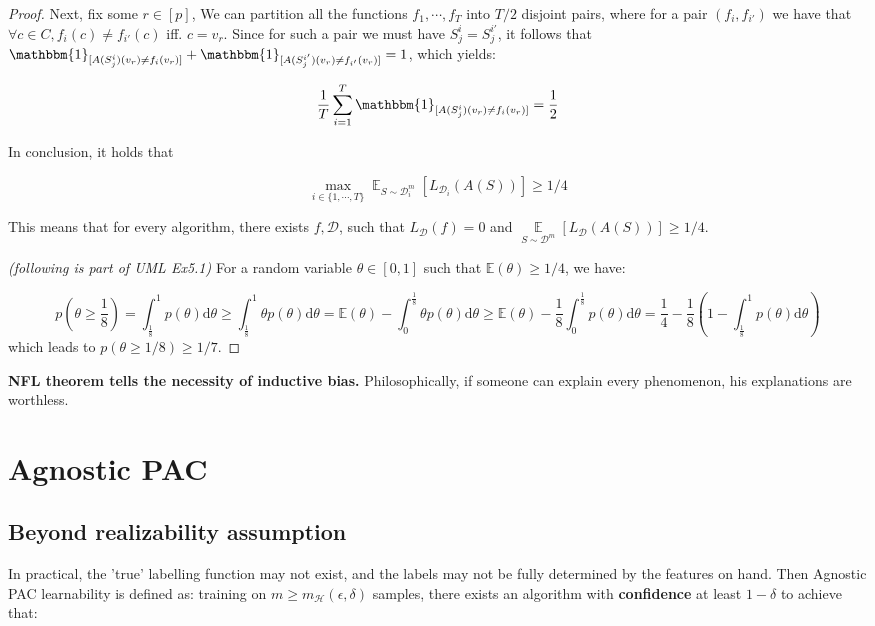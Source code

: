 \documentclass{article}
\newtheorem*{proof}{Proof}
\begin{document}
\begin{proof}
	Next, fix some $r\in[p]$, We can partition all the functions $f_1,\cdots,f_T$ into $T/2$ disjoint pairs, where for a pair $(f_i,f_{i'})$ we have that $\forall c\in C,f_i(c)\neq f_{i'}(c)$ iff. $c=v_r$. Since for such a pair we must have $S_j^i=S_j^{i'}$, it follows that $\mathbbm{1}_{[A(S_j^i)(v_r)\neq f_i(v_r)]}+\mathbbm{1}_{[A(S_j^{i'})(v_r)\neq f_{i'}(v_r)]}=1$, which yields:
	
	\begin{equation*}
	\frac{1}{T}\sum_{i=1}^T\mathbbm{1}_{[A(S_j^i)(v_r)\neq f_i(v_r)]}=\frac{1}{2}
	\end{equation*}

	In conclusion, it holds that

	\begin{equation*}
	\max_{i\in\{1,\cdots,T\}}\mathop{\mathbb{E}}_{S\sim\mathcal{D}_i^m}[L_{\mathcal{D}_i}(A(S))]\geq 1/4
	\end{equation*}

	This means that for every algorithm, there exists $f,\mathcal{D}$, such that $L_\mathcal{D}(f)=0$ and $\mathop{\mathbb{E}}\limits_{S\sim\mathcal{D}^m}[L_\mathcal{D}(A(S))]\geq 1/4$.

	\textit{(following is part of UML Ex5.1)} For a random variable $\theta\in[0,1]$ such that $\mathbb{E}(\theta)\geq 1/4$, we have:
	
	\begin{equation*}
	p\left(\theta\geq\frac{1}{8}\right)=\int_\frac{1}{8}^1 p(\theta) \mathrm{d}\theta \geq\int_\frac{1}{8}^1 \theta p(\theta) \mathrm{d}\theta=\mathbb{E}(\theta)-\int_0^\frac{1}{8}\theta p(\theta)\mathrm{d}\theta \geq\mathbb{E}(\theta)-\frac{1}{8}\int_0^\frac{1}{8} p(\theta)\mathrm{d}\theta = \frac{1}{4} - \frac{1}{8}\left( 1-\int^1_\frac{1}{8}p(\theta) \mathrm{d}\theta \right)
	\end{equation*}
which leads to $p(\theta\geq 1/8)\geq 1/7$.
	\end{proof}

	\textbf{NFL theorem tells the necessity of inductive bias.} Philosophically, if someone can explain every phenomenon, his explanations are worthless.
	
\section{Agnostic PAC}
	\subsection{Beyond realizability assumption}
	In practical, the 'true' labelling function may not exist, and the labels may not be fully determined by the features on hand. Then Agnostic PAC learnability is defined as: training on $m\geq m_\mathcal{H}(\epsilon,\delta)$ samples, there exists an algorithm with \textbf{confidence} at least $1-\delta$ to achieve that:
	
\end{document}

